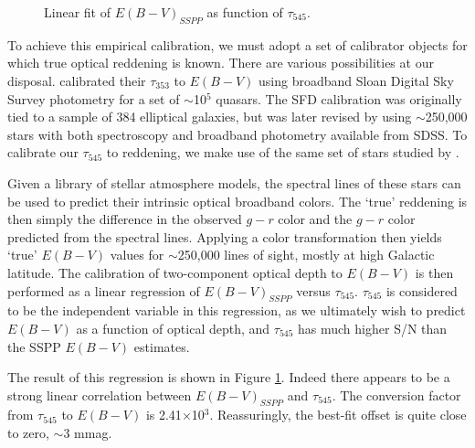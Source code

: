 \documentclass{emulateapj}
\begin{document}
\begin{figure}
\begin{center}
\caption{\label{fig:calib} Linear fit of $E(B-V)_{SSPP}$ as function of
$\tau_{545}$.}
\end{center}
\end{figure}

To achieve this empirical calibration, we must adopt a set of calibrator
objects for which true optical reddening is known. There are various 
possibilities at our disposal. \cite{planckdust} calibrated their $\tau_{353}$ 
to $E(B-V)$ using broadband Sloan Digital Sky Survey \citep[SDSS;][]{sdss} 
photometry for a set of $\sim$10$^5$ quasars. The SFD calibration was 
originally tied to a sample of 384 elliptical galaxies, but was later revised 
by \cite{schlafly11} using $\sim$250,000 stars with both spectroscopy and 
broadband photometry available from SDSS. To calibrate our $\tau_{545}$ to 
reddening, we make use of the same set of stars studied by \cite{schlafly11}.




Given a library of stellar atmosphere models, the spectral lines of these stars
can be used to predict their intrinsic optical broadband colors. The `true' 
reddening is then simply the difference in the observed $g-r$ color and the 
$g-r$ color predicted from the spectral lines. Applying a color transformation 
then yields `true' $E(B-V)$ values for $\sim$250,000 lines of sight, mostly at 
high Galactic latitude. The calibration of two-component optical depth to 
$E(B-V)$ is then performed as a linear regression of $E(B-V)_{SSPP}$ versus 
$\tau_{545}$. $\tau_{545}$ is considered to be the independent variable in this
regression, as we ultimately wish to predict $E(B-V)$ as a function of optical 
depth, and $\tau_{545}$ has much higher S/N than the SSPP $E(B-V)$ estimates. 


The result of this regression is shown in Figure \ref{fig:calib}. Indeed there 
appears to be a strong linear correlation between $E(B-V)_{SSPP}$ 
and $\tau_{545}$. The conversion factor from $\tau_{545}$ to $E(B-V)$ is 
2.41$\times$10$^{3}$. Reassuringly, the best-fit offset is quite close to 
zero, $\sim$3 mmag.
\end{document}

